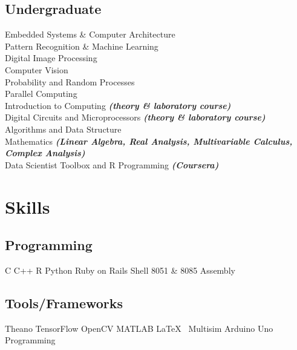 \documentclass[]{resume}
\begin{document}
\begin{minipage}[t]{0.33\textwidth}
\subsection{Undergraduate}
Embedded Systems \& Computer Architecture\\
Pattern Recognition \& Machine Learning \\
Digital Image Processing \\
Computer Vision \\
Probability and Random Processes \\
Parallel Computing\\
Introduction to Computing {\footnotesize \textit{\textbf{(theory \& laboratory course) }}} \\
Digital Circuits and Microprocessors {\footnotesize \textit{\textbf{(theory \& laboratory course) }}} \\
Algorithms and Data Structure \\
Mathematics {\footnotesize \textit{\textbf{(Linear Algebra, Real Analysis, Multivariable Calculus, Complex Analysis) }}} \\
Data Scientist Toolbox and R Programming {\footnotesize \textit{\textbf{(Coursera) }}} \\





\section{Skills}
\subsection{Programming}
C \textbullet{} C++ \textbullet{} R \textbullet{} Python \textbullet{} Ruby on Rails \textbullet{} Shell \textbullet{} 8051 \& 8085 Assembly
\subsection{Tools/Frameworks}
Theano \textbullet{} TensorFlow \textbullet{} OpenCV \textbullet{} MATLAB \textbullet{} \LaTeX\ \textbullet{} Multisim \textbullet{} Arduino Uno Programming

\end{minipage}
\end{document}
